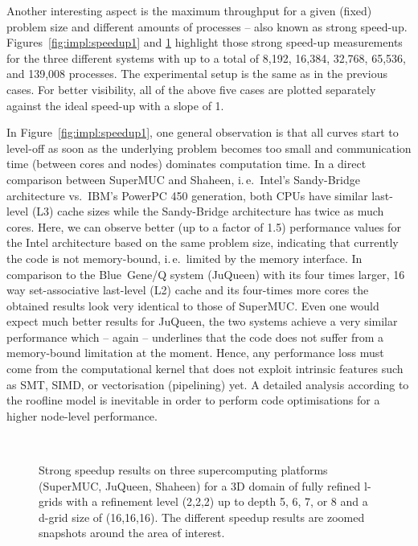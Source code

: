 \documentclass[10pt, conference, compsocconf]{IEEEtran}
\begin{document}
Another interesting aspect is the maximum throughput for a given (fixed) problem size and different amounts of processes -- also known as strong speed-up. Figures~\ref{fig:impl:speedup1} and \ref{fig:impl:speedup2} highlight those strong speed-up measurements for the three different systems with up to a total of 8,192, 16,384, 32,768, 65,536, and 139,008 processes. The experimental setup is the same as in the previous cases. For better visibility, all of the above five cases are plotted separately against the ideal speed-up with a slope of 1.

In Figure~\ref{fig:impl:speedup1}, one general observation is that all curves start to level-off as soon as the underlying problem becomes too small and communication time (between cores and nodes) dominates computation time. In a direct comparison between SuperMUC and Shaheen, i.\,e.\ Intel's Sandy-Bridge architecture vs.\ IBM's PowerPC 450 generation, both CPUs have similar last-level (L3) cache sizes while the Sandy-Bridge architecture has twice as much cores. Here, we can observe better (up to a factor of 1.5) performance values for the Intel architecture based on the same problem size, indicating that currently the code is not memory-bound, i.\,e.\ limited by the memory interface. In comparison to the Blue~Gene/Q system (JuQueen) with its four times larger, 16 way set-associative last-level (L2) cache and its four-times more cores the obtained results look very identical to those of SuperMUC. Even one would expect much better results for JuQueen, the two systems achieve a very similar performance which -- again -- underlines that the code does not suffer from a memory-bound limitation at the moment. Hence, any performance loss must come from the computational kernel that does not exploit intrinsic features such as SMT, SIMD, or vectorisation (pipelining) yet. A detailed analysis according to the roofline model \cite{Roofline2009} is inevitable in order to perform code optimisations for a higher node-level performance.

\begin{figure}[!htbp]
	\centering
	 \\
	\caption{Strong speedup results on three supercomputing platforms (SuperMUC, JuQueen, Shaheen) for a 3D domain of fully refined l-grids with a refinement level (2,2,2) up to depth 5, 6, 7, or 8 and a d-grid size of (16,16,16). The different speedup results are zoomed snapshots around the area of interest.}
		\label{fig:impl:speedup2}
\end{figure}
\end{document}
